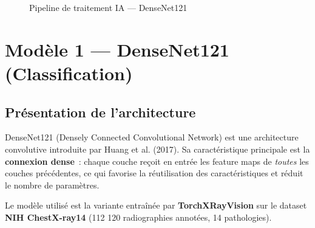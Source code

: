 \documentclass[12pt, a4paper]{report}
\begin{document}
\begin{figure}[H]
  \centering
  \caption{Pipeline de traitement IA — DenseNet121}
  \label{fig:pipeline}
\end{figure}

\section{Modèle 1 — DenseNet121 (Classification)}

\subsection{Présentation de l'architecture}

DenseNet121 (Densely Connected Convolutional Network) est une architecture
convolutive introduite par Huang et al. (2017). Sa caractéristique principale
est la \textbf{connexion dense}~: chaque couche reçoit en entrée les feature maps
de \textit{toutes} les couches précédentes, ce qui favorise la réutilisation des
caractéristiques et réduit le nombre de paramètres.

Le modèle utilisé est la variante entraînée par \textbf{TorchXRayVision} sur le
dataset \textbf{NIH ChestX-ray14} (112 120 radiographies annotées, 14
pathologies).
\end{document}
